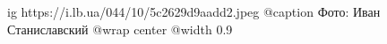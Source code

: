  
 
 
 
 

\ifcmt
  ig https://i.lb.ua/044/10/5c2629d9aadd2.jpeg
	@caption Фото: Иван Станиславский
  @wrap center
  @width 0.9
\fi
